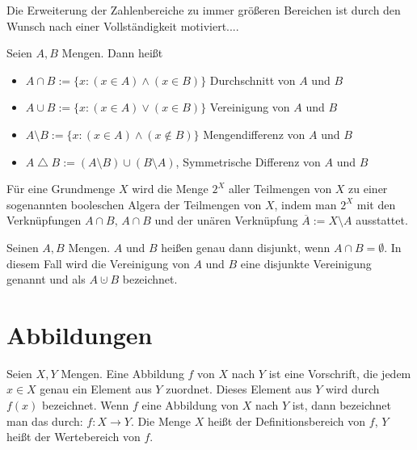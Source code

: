 \begin{bem}
		Die Erweiterung der  Zahlenbereiche zu immer größeren Bereichen ist durch den Wunsch nach einer Vollständigkeit motiviert.... 
\end{bem} 


\begin{defn}
Seien $ A,B $ Mengen. Dann heißt
\begin{itemize}
\item $ A \cap B := \{ x : (x \in A) \wedge (x \in B) \} $ Durchschnitt von $ A $ und $ B $
\item $ A \cup B := \{ x : (x \in A) \vee (x \in B) \} $ Vereinigung von $ A $ und $ B $
\item $ A \setminus B := \{ x : (x \in A) \wedge (x \notin B) \} $ Mengendifferenz von $ A $ und $ B $
\item $A \operatorname{\triangle} B := (A \setminus B) \cup (B \setminus A)$, Symmetrische Differenz von $A$ und $B$ 
\end{itemize}
\end{defn}

\begin{bem}
	Für eine Grundmenge $X$ wird die Menge $2^X$ aller Teilmengen von $X$ zu einer sogenannten booleschen Algera der Teilmengen von $X$, indem man $2^X$ mit den Verknüpfungen $A \cap B$, $A \cap B$ und der unären Verknüpfung $\overline{A} := X \setminus A$ ausstattet. 
\end{bem} 

\begin{defn}
Seinen $ A,B $ Mengen. $ A $ und $ B $ heißen genau dann disjunkt, wenn $ A \cap B = \emptyset $. In diesem Fall wird die Vereinigung von $A$ und $B$ eine disjunkte Vereinigung genannt
und als $A \cupdot B$ bezeichnet. 
\end{defn}

\section{Abbildungen}


\begin{defn}
Seien $ X,Y $ Mengen. Eine Abbildung $ f $ von $ X $ nach $ Y $ ist eine Vorschrift, die jedem $ x \in X $ genau ein Element aus $ Y $ zuordnet. Dieses Element aus $ Y $ wird durch $ f(x) $ bezeichnet. Wenn $ f $ eine Abbildung von $ X $ nach $ Y $ ist, dann bezeichnet man das durch: $ f : X \to Y $. Die Menge $ X $ heißt der Definitionsbereich von $ f $, $ Y $ heißt der Wertebereich von $ f $.
\end{defn} 

